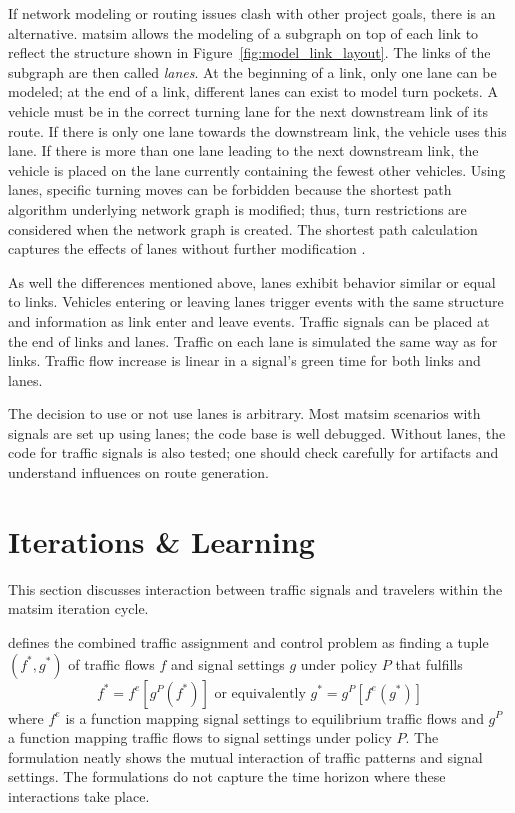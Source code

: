 If network modeling or routing issues clash with other project goals, there is an alternative. 
\gls{matsim} allows the modeling of a subgraph on top of each link to reflect the structure shown in Figure~\ref{fig:model_link_layout}. 
The links of the subgraph are then called \emph{lanes}. 
At the beginning of a link, only one lane can be modeled; at the end of a link, different lanes can exist to model turn pockets. 
A vehicle must  be in the correct turning lane for the next downstream link of its route. 
If there is only one lane towards the downstream link, the vehicle uses this lane. 
If there is more than one lane leading to the next downstream link, the vehicle is placed on the lane currently containing the fewest other vehicles.
Using lanes, specific turning moves can be forbidden because the shortest path algorithm underlying network graph is modified;  
thus, turn restrictions are considered when the network graph is created.  
The shortest path calculation captures the effects of lanes without further modification \citep[see][pp.~21]{Grether2014PhD}.  

As well the differences mentioned above, lanes exhibit behavior similar or equal to links.  
Vehicles entering or leaving lanes trigger events with the same structure and information as link enter and leave events.
Traffic signals can be placed at the end of links and lanes. 
Traffic on each lane is simulated the same way as for links. 
Traffic flow increase is linear in a signal's green time for both links and lanes. 

The decision to use or not use lanes is arbitrary. 
Most \gls{matsim} scenarios with signals are set up using lanes; the code base is well debugged. 
Without lanes, the code for traffic signals is also tested; one should check carefully for artifacts and understand influences on route generation. 

\section{Iterations \& Learning}
\label{sec:signals_iterations_learning}
This section discusses interaction between traffic signals and travelers within the \gls{matsim} iteration cycle. 

\citet{Meneguzzer1997ModelReviewTrafficAssignmentSignalControl} defines the combined traffic assignment and control problem as finding a tuple $(f^{*}, g^{*})$ of traffic flows $f$ and signal settings $g$ under policy $P$ that fulfills  
\[
f^{*} = f^{e}[g^{P}(f^{*})] \mbox{  or  equivalently } g^{*} = g^{P}[f^{e}(g^{*})]
\]
where $f^{e}$ is a function mapping signal settings to equilibrium traffic flows and $g^{P}$ a function mapping traffic flows to signal settings under policy $P$.  
The formulation neatly shows the mutual interaction of traffic patterns and signal settings.  
The formulations do not capture the time horizon where these interactions take place. 

